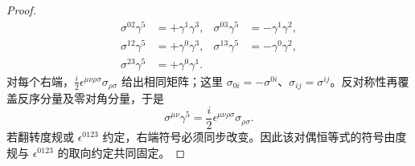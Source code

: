 \begin{proof}
\begin{align*}
\sigma^{02}\gamma^5&=+\gamma^1\gamma^3,&
\sigma^{03}\gamma^5&=-\gamma^1\gamma^2,\\
\sigma^{12}\gamma^5&=+\gamma^0\gamma^3,&
\sigma^{13}\gamma^5&=-\gamma^0\gamma^2,\\
\sigma^{23}\gamma^5&=+\gamma^0\gamma^1.
\end{align*}
对每个右端，$\frac{i}{2}\epsilon^{\mu\nu\rho\sigma}\sigma_{\rho\sigma}$ 给出相同矩阵；这里 $\sigma_{0i}=-\sigma^{0i}$、$\sigma_{ij}=\sigma^{ij}$。反对称性再覆盖反序分量及零对角分量，于是
\begin{equation*}
{
\sigma^{\mu\nu}\gamma^5
=\frac{i}{2}\epsilon^{\mu\nu\rho\sigma}\sigma_{\rho\sigma}.}
\end{equation*}
若翻转度规或 $\epsilon^{0123}$ 约定，右端符号必须同步改变。因此该对偶恒等式的符号由度规与 $\epsilon^{0123}$ 的取向约定共同固定。
\end{proof}

